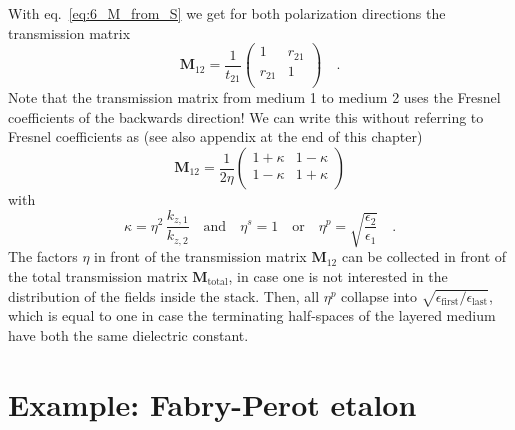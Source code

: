 With eq.~\ref{eq:6_M_from_S} we get for both polarization directions the transmission matrix
\begin{equation}
\mathbf{M}_{12} = \frac{1}{t_{21}} 
\begin{pmatrix}
1 & r_{21} \\ r_{21} & 1 \\
\end{pmatrix} \quad .
\end{equation}
Note that the transmission matrix from medium 1 to medium 2 uses the Fresnel coefficients of the backwards direction!
We can write this without referring to Fresnel coefficients as (see also appendix at the end of this chapter)
\begin{equation}
\mathbf{M}_{12} 
=\frac{ 1}{2 \eta }
\begin{pmatrix}
1 + \kappa & 1  -\kappa \\  1  - \kappa  & 1 + \kappa \\
\end{pmatrix} \label{eq:6_M_kappa}
\end{equation}
with 
\begin{equation}
\kappa = \eta^2 \,
\frac{  k_{z,1} }{ k_{z,2}}
\quad
\text{and}
\quad
\eta^s = 1 \quad \text{or} \quad \eta^p = \sqrt{ \frac{\epsilon_2}{\epsilon_1} } \quad . 
\end{equation}
The factors $\eta$ in front of the transmission matrix $\mathbf{M}_{12} $ can be collected in front of the total transmission matrix $\mathbf{M}_\text{total}$, in case one is not interested in the distribution of the fields inside the stack. Then, all $\eta^p$ collapse into $\sqrt{\epsilon_\text{first} / \epsilon_\text{last}}$, which is equal to one in case the terminating half-spaces of the layered medium have both the same dielectric constant. 


\section{Example: Fabry-Perot etalon}

